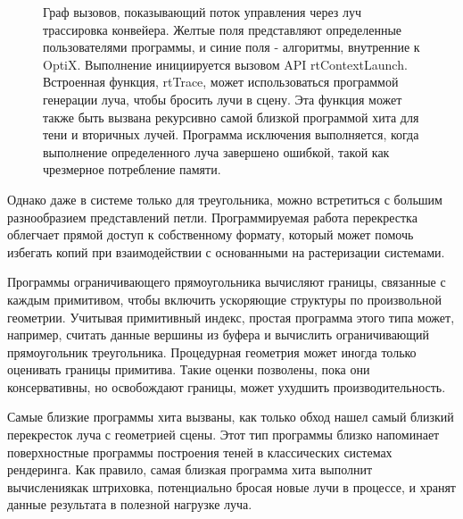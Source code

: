 \begin{figure}[h]
\caption{Граф вызовов, показывающий поток управления через луч
трассировка конвейера. Желтые поля представляют определенные пользователями программы, и синие поля - алгоритмы, внутренние к OptiX. Выполнение инициируется вызовом API rtContextLaunch. Встроенная функция, rtTrace, может использоваться программой генерации луча, чтобы бросить лучи в сцену. Эта функция может также быть вызвана рекурсивно
самой близкой программой хита для тени и вторичных лучей.
Программа исключения выполняется, когда выполнение определенного луча завершено ошибкой, такой как чрезмерное потребление памяти.}
\label{fig}
\end{figure}

Однако даже в системе только для треугольника, можно встретиться с большим разнообразием представлений петли.
 Программируемая работа перекрестка облегчает прямой доступ к собственному формату, который может помочь избегать копий при взаимодействии с основанными на растеризации системами.
 
   Программы ограничивающего прямоугольника вычисляют границы, связанные с каждым примитивом, чтобы включить ускоряющие структуры по произвольной геометрии. Учитывая примитивный индекс, простая программа этого типа может, например, считать данные вершины из буфера и вычислить ограничивающий прямоугольник треугольника. Процедурная геометрия может иногда только оценивать границы примитива. Такие оценки позволены, пока они консервативны, но освобождают границы, может ухудшить производительность. 

Самые близкие программы хита вызваны, как только обход нашел самый близкий перекресток луча с геометрией сцены. Этот тип программы близко напоминает поверхностные программы построения теней в классических системах рендеринга. Как правило, самая близкая программа хита выполнит вычислениякак штриховка, потенциально бросая новые лучи в процессе, и хранят данные результата в полезной нагрузке луча. 

